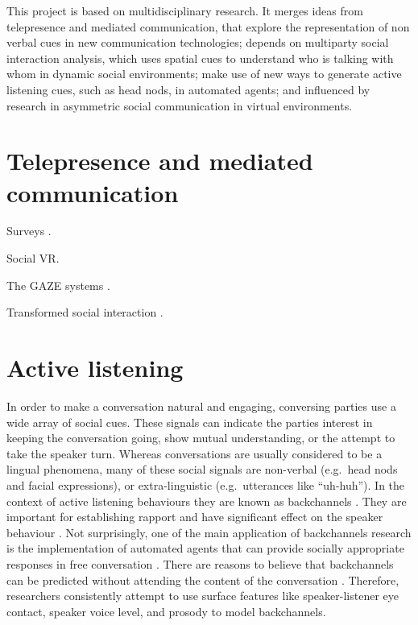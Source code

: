 \documentclass[]{simple-thesis}
\begin{document}
This project is based on multidisciplinary research.
It merges ideas from telepresence and mediated communication, that explore the representation of non verbal cues in new communication technologies;
depends on multiparty social interaction analysis, which uses spatial cues to understand who is talking with whom in dynamic social environments;
make use of new ways to generate active listening cues, such as head nods, in automated agents;
and influenced by research in asymmetric social communication in virtual environments.

\section{Telepresence and mediated communication}

Surveys \citep{Isaacs1994, Erickson2000}.

Social VR.

The GAZE systems \citep{Vertegaal1999, Vertegaal2003}.

Transformed social interaction \citep{Bailenson2004, Bailenson2008}.

\section{Active listening}

In order to make a conversation natural and engaging, conversing parties use a wide array of social cues.
These signals can indicate the parties interest in keeping the conversation going, show mutual understanding, or the attempt to take the speaker turn.
Whereas conversations are usually considered to be a lingual phenomena, many of these social signals are non-verbal (e.g.\ head nods and facial expressions), or extra-linguistic (e.g.\ utterances like ``uh-huh'').
In the context of active listening behaviours they are known as backchannels \citep{Yngve1970}.
They are important for establishing rapport \citep{Gratch2007} and have significant effect on the speaker behaviour \citep{Bavelas2000}.
Not surprisingly, one of the main application of backchannels research is the implementation of automated agents that can provide socially appropriate responses in free conversation \citep{Morency2008, Bevacqua2008}.
There are reasons to believe that backchannels can be predicted without attending the content of the conversation \citep{Yngve1970}.
Therefore, researchers consistently attempt to use surface features like speaker-listener eye contact, speaker voice level, and prosody to model backchannels.
\end{document}

